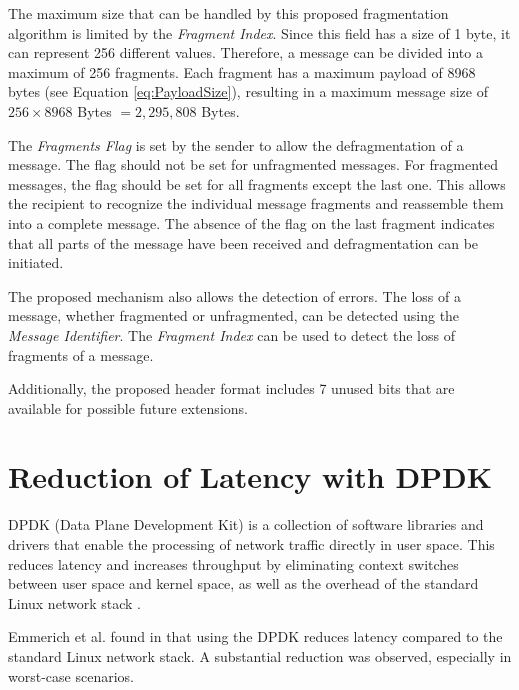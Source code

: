 The maximum size that can be handled by this proposed fragmentation algorithm is limited by the \textit{Fragment Index}. Since this field has a size of 1 byte, it can represent 256 different values. Therefore, a message can be divided into a maximum of 256 fragments. Each fragment has a maximum payload of 8968 bytes (see Equation \ref{eq:PayloadSize}), resulting in a maximum message size of $256 \times 8968$ Bytes $= 2,295,808$ Bytes.

The \textit{Fragments Flag} is set by the sender to allow the defragmentation of a message. The flag should not be set for unfragmented messages. For fragmented messages, the flag should be set for all fragments except the last one. This allows the recipient to recognize the individual message fragments and reassemble them into a complete message. The absence of the flag on the last fragment indicates that all parts of the message have been received and defragmentation can be initiated.

The proposed mechanism also allows the detection of errors. The loss of a message, whether fragmented or unfragmented, can be detected using the \textit{Message Identifier}. The \textit{Fragment Index} can be used to detect the loss of fragments of a message.

Additionally, the proposed header format includes 7 unused bits that are available for possible future extensions.


\section{Reduction of Latency with DPDK}
DPDK (Data Plane Development Kit) is a collection of software libraries and drivers that enable the processing of network traffic directly in user space. This reduces latency and increases throughput by eliminating context switches between user space and kernel space, as well as the overhead of the standard Linux network stack \cite{outl02}.

Emmerich et al. found in \cite{outl01} that using the DPDK reduces latency compared to the standard Linux network stack. A substantial reduction was observed, especially in worst-case scenarios.